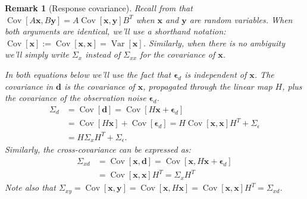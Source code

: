\documentclass[12pt, a4paper]{article}
\theoremstyle{spaced}
\theoremstyle{spaceddef}
\numberwithin{equation}{section}
\newtheorem{remarkinner}[theorem]{Remark}
\newenvironment{remark}
{\savenotes
    \begin{tcolorbox}[colback=white, colframe=black!80, arc=4pt, boxrule=0.5pt]%
        \begin{remarkinner}}
        {\end{remarkinner}\end{tcolorbox}\spewnotes}
\begin{document}
\begin{remark}[Response covariance]
    \label{remark:response_covariance}
    Recall from \citet[Section~6.2]{petersen2012matrix} that $\operatorname{Cov}\left[A\bm{x}, B\bm{y}\right] = A \operatorname{Cov}\left[\bm{x}, \bm{y}\right] B^T$ when $\bm{x}$ and $\bm{y}$ are random variables.
    When both arguments are identical, we'll use a shorthand notation:  $\operatorname{Cov}\left[\bm{x}\right] := \operatorname{Cov}\left[\bm{x}, \bm{x}\right] = \operatorname{Var}\left[\bm{x}\right]$.
    Similarly, when there is no ambiguity we'll simply write $\Sigma_x$ instead of $\Sigma_{xx}$ for the covariance of $\bm{x}$.

    In both equations below we'll use the fact that $\bm{\epsilon}_d$ is independent of $\bm{x}$.
    The covariance in $\bm{d}$ is the covariance of $\bm{x}$, propagated through the linear map $H$, plus the covariance of the observation noise $\bm{\epsilon}_d$.
    \begin{align*}
        \Sigma_{d} &=
        \operatorname{Cov}\left[ \bm{d} \right]
        = \operatorname{Cov}\left[ H\bm{x} + \bm{\epsilon}_d \right] \\
        &= \operatorname{Cov}\left[ H\bm{x}  \right]
        + \operatorname{Cov}\left[ \bm{\epsilon}_d \right]
        = H \operatorname{Cov}\left[\bm{x}, \bm{x}\right] H^T
        + \Sigma_{\epsilon} \\
        & = H \Sigma_x H^T
        + \Sigma_{\epsilon}.
    \end{align*}
    Similarly, the cross-covariance can be expressed as:
\begin{align*}
    \Sigma_{xd} &=
    \operatorname{Cov}\left[ \bm{x}, \bm{d} \right] =
    \operatorname{Cov}\left[ \bm{x}, H\bm{x} + \bm{\epsilon}_d \right]  \\
    &=
    \operatorname{Cov}\left[ \bm{x}, \bm{x} \right] H^T = \Sigma_x H^T
\end{align*}
Note also that $\Sigma_{xy} =
\operatorname{Cov}\left[ \bm{x}, \bm{y} \right] =
\operatorname{Cov}\left[ \bm{x}, H\bm{x} \right] =
\operatorname{Cov}\left[\bm{x}, \bm{x}\right] H^T =
 \Sigma_{xd}$.
\end{remark}
\end{document}
